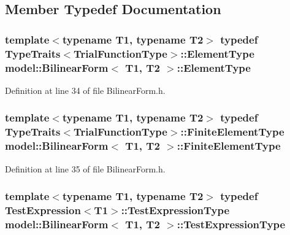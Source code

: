 \subsection{Member Typedef Documentation}
\hypertarget{structmodel_1_1_bilinear_form_a913af0f41b1e5dc3de899a221d0351c4}{}
\subsubsection[{Element\+Type}]{\setlength{\rightskip}{0pt plus 5cm}template$<$typename T1, typename T2$>$ typedef {\bf Type\+Traits}$<${\bf Trial\+Function\+Type}$>$\+::{\bf Element\+Type} {\bf model\+::\+Bilinear\+Form}$<$ T1, T2 $>$\+::{\bf Element\+Type}}\label{structmodel_1_1_bilinear_form_a913af0f41b1e5dc3de899a221d0351c4}


Definition at line 34 of file Bilinear\+Form.\+h.

\hypertarget{structmodel_1_1_bilinear_form_a65a70814fa4b79b108aa83563c825408}{}
\subsubsection[{Finite\+Element\+Type}]{\setlength{\rightskip}{0pt plus 5cm}template$<$typename T1, typename T2$>$ typedef {\bf Type\+Traits}$<${\bf Trial\+Function\+Type}$>$\+::{\bf Finite\+Element\+Type} {\bf model\+::\+Bilinear\+Form}$<$ T1, T2 $>$\+::{\bf Finite\+Element\+Type}}\label{structmodel_1_1_bilinear_form_a65a70814fa4b79b108aa83563c825408}


Definition at line 35 of file Bilinear\+Form.\+h.

\hypertarget{structmodel_1_1_bilinear_form_a9283d1ee67b9315a45ee36453e74f1e2}{}
\subsubsection[{Test\+Expression\+Type}]{\setlength{\rightskip}{0pt plus 5cm}template$<$typename T1, typename T2$>$ typedef {\bf Test\+Expression}$<$T1$>$\+::{\bf Test\+Expression\+Type} {\bf model\+::\+Bilinear\+Form}$<$ T1, T2 $>$\+::{\bf Test\+Expression\+Type}}\label{structmodel_1_1_bilinear_form_a9283d1ee67b9315a45ee36453e74f1e2}


